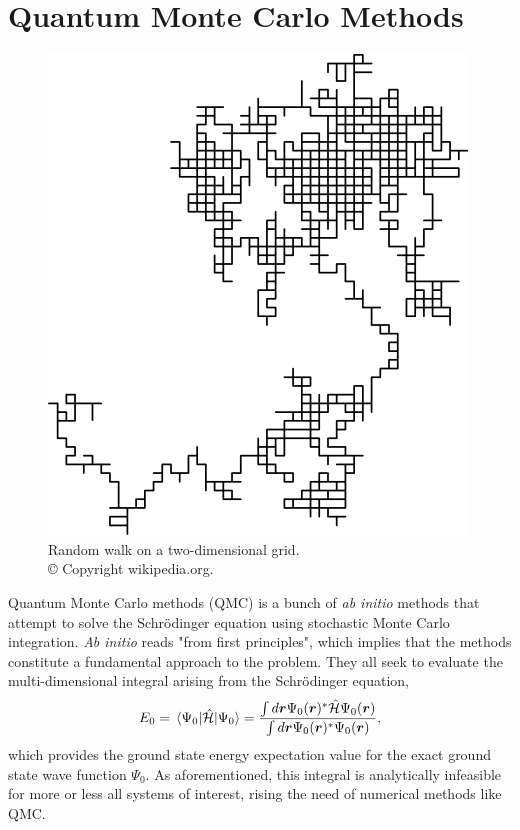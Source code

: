 \chapter{Quantum Monte Carlo Methods} \label{chp:methods}
\begin{figure}[H]
	\centering
	\includegraphics[scale=0.4]{Images/random_walk.png}
	\caption{Random walk on a two-dimensional grid.\\ © Copyright wikipedia.org.}
\end{figure}

Quantum Monte Carlo methods (QMC) is a bunch of \textit{ab initio} methods that attempt to solve the Schrödinger equation using stochastic Monte Carlo integration. \textit{Ab initio} reads "from first principles", which implies that the methods constitute a fundamental approach to the problem. They all seek to evaluate the multi-dimensional integral arising from the Schrödinger equation,
\begin{equation}
E_0= \mel{\Psi_0}{\hat{\mathcal{H}}}{\Psi_0}= \frac{\int d\bs{r}\Psi_0(\bs{r})^*\hat{\mathcal{H}}\Psi_0(\bs{r})}{\int d\bs{r}\Psi_0(\bs{r})^*\Psi_0(\bs{r})},
\label{eq:schrodingergroundstate}
\end{equation}
which provides the ground state energy expectation value for the exact ground state wave function $\Psi_0$. As aforementioned, this integral is analytically infeasible for more or less all systems of interest, rising the need of numerical methods like QMC.

